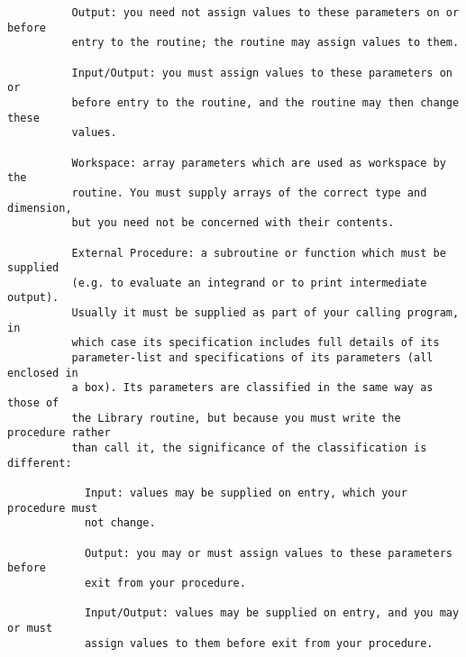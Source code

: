 \begin{small}
\begin{verbatim}
          Output: you need not assign values to these parameters on or before     
          entry to the routine; the routine may assign values to them.            
                                                                                  
          Input/Output: you must assign values to these parameters on or          
          before entry to the routine, and the routine may then change these      
          values.                                                                 
                                                                                  
          Workspace: array parameters which are used as workspace by the          
          routine. You must supply arrays of the correct type and dimension,      
          but you need not be concerned with their contents.                      
                                                                                  
          External Procedure: a subroutine or function which must be supplied     
          (e.g. to evaluate an integrand or to print intermediate output).        
          Usually it must be supplied as part of your calling program, in         
          which case its specification includes full details of its               
          parameter-list and specifications of its parameters (all enclosed in    
          a box). Its parameters are classified in the same way as those of       
          the Library routine, but because you must write the procedure rather    
          than call it, the significance of the classification is different:      
                                                                                  
            Input: values may be supplied on entry, which your procedure must     
            not change.                                                           
                                                                                  
            Output: you may or must assign values to these parameters before      
            exit from your procedure.                                             
                                                                                  
            Input/Output: values may be supplied on entry, and you may or must    
            assign values to them before exit from your procedure.                
                                                                                  

\end{verbatim}
\end{small}

